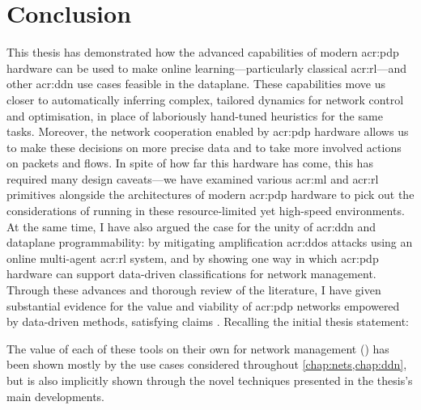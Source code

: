 \chapter{Conclusion}\label{chap:conclusion}
This thesis has demonstrated how the advanced capabilities of modern \gls{acr:pdp} hardware can be used to make online learning---particularly classical \gls{acr:rl}---and other \gls{acr:ddn} use cases feasible in the dataplane.
These capabilities move us closer to automatically inferring complex, tailored dynamics for network control and optimisation, in place of laboriously hand-tuned heuristics for the same tasks.
Moreover, the network cooperation enabled by \gls{acr:pdp} hardware allows us to make these decisions on more precise data and to take more involved actions on packets and flows.
In spite of how far this hardware has come, this has required many design caveats---we have examined various \gls{acr:ml} and \gls{acr:rl} primitives alongside the architectures of modern \gls{acr:pdp} hardware to pick out the considerations of running in these resource-limited yet high-speed environments.
At the same time, I have also argued the case for the unity of \gls{acr:ddn} and dataplane programmability: by mitigating amplification \gls{acr:ddos} attacks using an online multi-agent \gls{acr:rl} system, and by showing one way in which \gls{acr:pdp} hardware can support data-driven classifications for network management.
%
Through these advances and thorough review of the literature, I have given substantial evidence for the value and viability of \gls{acr:pdp} networks empowered by data-driven methods, satisfying claims .
Recalling the initial thesis statement:
\begin{quotation}
	\noindent
\end{quotation}
The value of each of these tools on their own for network management () has been shown mostly by the use cases considered throughout \cref{chap:nets,chap:ddn}, but is also implicitly shown through the novel techniques presented in the thesis's main developments.

